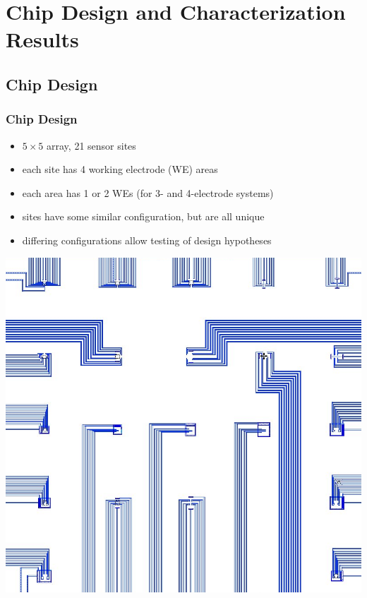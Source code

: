 \documentclass[10pt]{beamer}
\begin{document}
\section{Chip Design and Characterization Results}
\subsection{Chip Design}
\begin{frame}
	\frametitle{Chip Design}
	\begin{itemize}
		\item $5 \times 5$ array, 21 sensor sites
		\item each site has 4 working electrode (WE) areas
		\item each area has 1 or 2 WEs (for 3- and 4-electrode systems)
		\item sites have some similar configuration, but are all unique
		\item differing configurations allow testing of design hypotheses
	\end{itemize}
	\includegraphics[width=0.5\linewidth]{figures/biosensorchip-sensors.png}
\end{frame}
\end{document}

